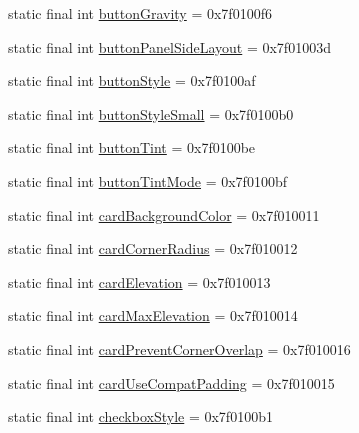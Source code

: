 \begin{CompactItemize}
\item 
static final int \hyperlink{classandroid_1_1support_1_1v7_1_1appcompat_1_1_r_1_1attr_a2c7770429139646a27230628dd10ec5}{buttonGravity} = 0x7f0100f6
\item 
static final int \hyperlink{classandroid_1_1support_1_1v7_1_1appcompat_1_1_r_1_1attr_67874a52ac270d7b9a5c3cdbe5094cb2}{buttonPanelSideLayout} = 0x7f01003d
\item 
static final int \hyperlink{classandroid_1_1support_1_1v7_1_1appcompat_1_1_r_1_1attr_b1ea71473584e24432c9a1646f717398}{buttonStyle} = 0x7f0100af
\item 
static final int \hyperlink{classandroid_1_1support_1_1v7_1_1appcompat_1_1_r_1_1attr_fee250bae7d7eefc571d286c08027751}{buttonStyleSmall} = 0x7f0100b0
\item 
static final int \hyperlink{classandroid_1_1support_1_1v7_1_1appcompat_1_1_r_1_1attr_3f9979e459254abc7c58ece1d6fa005d}{buttonTint} = 0x7f0100be
\item 
static final int \hyperlink{classandroid_1_1support_1_1v7_1_1appcompat_1_1_r_1_1attr_d5f8e37859d659113e7c73300c55fc2e}{buttonTintMode} = 0x7f0100bf
\item 
static final int \hyperlink{classandroid_1_1support_1_1v7_1_1appcompat_1_1_r_1_1attr_d6cb0abb2cb9d9f89ea1c3611845b569}{cardBackgroundColor} = 0x7f010011
\item 
static final int \hyperlink{classandroid_1_1support_1_1v7_1_1appcompat_1_1_r_1_1attr_26c5d675d9df291980c5facc92c60409}{cardCornerRadius} = 0x7f010012
\item 
static final int \hyperlink{classandroid_1_1support_1_1v7_1_1appcompat_1_1_r_1_1attr_269f5afaaea21f1e91141d6c3b37bfb3}{cardElevation} = 0x7f010013
\item 
static final int \hyperlink{classandroid_1_1support_1_1v7_1_1appcompat_1_1_r_1_1attr_ed766bc49c8a40b40002aef417ad31de}{cardMaxElevation} = 0x7f010014
\item 
static final int \hyperlink{classandroid_1_1support_1_1v7_1_1appcompat_1_1_r_1_1attr_9f65630fe83ebdf9b9c17142f764a9c7}{cardPreventCornerOverlap} = 0x7f010016
\item 
static final int \hyperlink{classandroid_1_1support_1_1v7_1_1appcompat_1_1_r_1_1attr_b439d93cd16a6038d06d9ab8d4ac917b}{cardUseCompatPadding} = 0x7f010015
\item 
static final int \hyperlink{classandroid_1_1support_1_1v7_1_1appcompat_1_1_r_1_1attr_a8add12cf7fd8fc3504546c37be1aecc}{checkboxStyle} = 0x7f0100b1
\item 

\end{CompactItemize}
